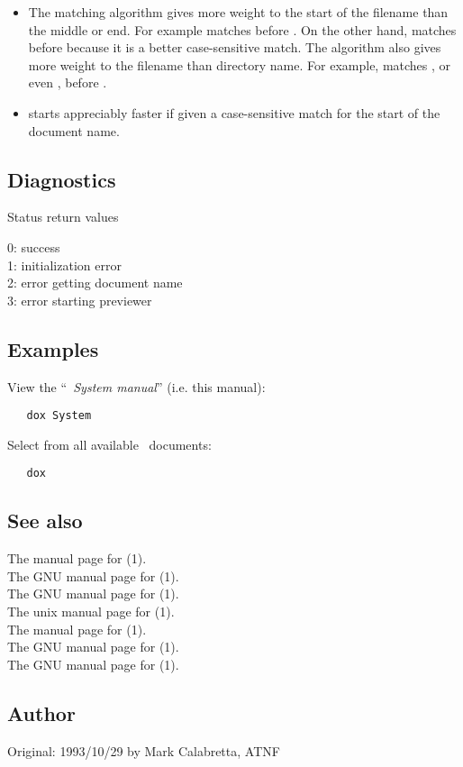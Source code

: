 \begin{itemize}
\item
   The matching algorithm gives more weight to the start of the filename than
   the middle or end.  For example  matches  before
   .  On the other hand,  matches  before
    because it is a better case-sensitive match.  The algorithm
   also gives more weight to the filename than directory name.  For example,
    matches , or even , before
   .

\item
    starts appreciably faster if given a case-sensitive match for the
   start of the document name.
\end{itemize}

\subsection*{Diagnostics}

Status return values
\begin{status}
   0:  success\\
   1:  initialization error\\
   2:  error getting document name\\
   3:  error starting previewer
\end{status}

\subsection*{Examples}

View the ``\textit{\aipspp\ System manual}'' (i.e. this manual):

\begin{verbatim}
   dox System
\end{verbatim}

\noindent
Select from all available \aipspp\ documents:

\begin{verbatim}
   dox
\end{verbatim}

\subsection*{See also}

The manual page for (1).\\
The GNU manual page for (1).\\
The GNU manual page for (1).\\
The unix manual page for (1).\\
The manual page for (1).\\
The GNU manual page for (1).\\
The GNU manual page for (1).

\subsection*{Author}

Original: 1993/10/29 by Mark Calabretta, ATNF
